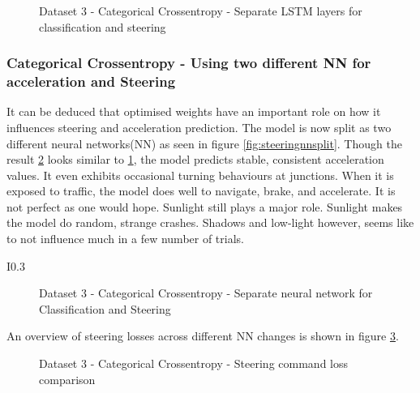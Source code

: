 \begin{figure}[h]
	\centering
    \def\svgwidth{0.8\textwidth}
    \caption{Dataset 3 - Categorical Crossentropy - Separate LSTM layers for
    classification and steering}
    \label{fig:ds3categoricalcrossentropylstm}
\end{figure}
\subsubsection*{Categorical Crossentropy - Using two different NN for acceleration and
Steering}
It can be deduced that optimised weights have an important role on how it influences
steering and acceleration prediction. The model is now split as two different neural
networks(NN) as seen in figure \ref{fig:steeringnnsplit}. Though the result
\ref{fig:ds3categoricalcrossentropy2nn} looks similar to
\ref{fig:ds3categoricalcrossentropylstm}, the model predicts stable, consistent
acceleration values. It even exhibits occasional turning behaviours at junctions. When it
is exposed to traffic, the model does well to navigate, brake, and accelerate. It is not
perfect as one would hope. Sunlight still plays a major role. Sunlight makes the model do
random, strange crashes. Shadows and low-light however, seems like to not influence much
in a few number of trials.
\begin{wrapfigure}{I}{0.3\textwidth}
	\centering
    \def\svgwidth{0.3\textwidth}
    \caption{Separate NN training model}
    \label{fig:steeringnnsplit}
\end{wrapfigure}

\begin{figure}[h]
	\centering
    \def\svgwidth{0.8\textwidth}
    \caption{Dataset 3 - Categorical Crossentropy - Separate neural network for
    Classification and Steering}
    \label{fig:ds3categoricalcrossentropy2nn}
\end{figure}
 An overview of steering losses across different NN changes is shown in figure
 \ref{fig:ds3categoricalcrossentropysteeringcompare}.
\begin{figure}[h]
	\centering
    \def\svgwidth{\textwidth}
    \caption{Dataset 3 - Categorical Crossentropy - Steering command loss comparison}
    \label{fig:ds3categoricalcrossentropysteeringcompare}
\end{figure}
